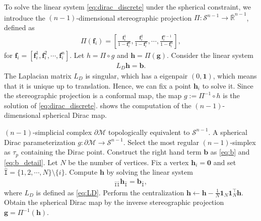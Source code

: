 \documentclass{article}
\begin{document}
To solve the linear system \eqref{eq:dirac_discrete} under the spherical constraint, we introduce the $(n-1)$-dimensional stereographic projection $\Pi:\mathcal{S}^{n-1} \to \overline{\mathbb{R}}^{n-1}$, defined as
\begin{align}
    \Pi(\mathbf{f}_i) = \left[ \frac{\mathbf{f}_i^{1}}{1-\mathbf{f}_i^{n}}, \frac{\mathbf{f}_i^{2}}{1-\mathbf{f}_i^{n}}, \cdots, \frac{\mathbf{f}_i^{n-1}}{1-\mathbf{f}_i^{n}} \right],
\end{align}
for $\mathbf{f}_i = [\mathbf{f}_i^1, \mathbf{f}_i^2, \cdots, \mathbf{f}_i^n]$. Let $h = \Pi \circ g$ and $\mathbf{h} = \Pi(\mathbf{g})$. Consider the linear system
\begin{align}
    L_D \mathbf{h} = \mathbf{b}.
\end{align}
The Laplacian matrix $L_D$ is singular, which has a eigenpair $(0,\mathbf{1})$, which means that it is unique up to translation. Hence, we can fix a point $\mathbf{h}_i$ to solve it. Since the stereographic projection is a conformal map, the map $g := \Pi^{-1}\circ h$ is the solution of \eqref{eq:dirac_discrete}.  shows the computation of the $(n-1)$-dimensional spherical Dirac map.

\begin{algorithm}[h]
\caption{Spherical parameterization by Dirac map}
\begin{algorithmic}[1] \label{alg:Dirac}
    \REQUIRE $(n-1)$-simplicial complex $\partial \mathcal{M}$ topologically equivalent to $\mathcal{S}^{n-1}$.
    \ENSURE A spherical Dirac parameterization $g: \partial \mathcal{M}\to \mathcal{S}^{n-1}$.
    \STATE Select the most regular $(n-1)$-simplex as $\tau_p$ containing the Dirac point.
    \STATE Construct the right hand term $\mathbf{b}$ as \eqref{eq:b} and \eqref{eq:b_detail}.
    \STATE Let $N$ be the number of vertices. Fix a vertex $\mathbf{h}_i = \mathbf{0}$ and set $\hat{\mathtt{I}} = \{1,2,\cdots,N\}\setminus \{i\}$.
    \STATE Compute $\mathbf{h}$ by solving the linear system
    \begin{align}
        [L_D]_{\hat{\mathtt{I}}\hat{\mathtt{I}}} \mathbf{h}_{\hat{\mathtt{I}}} = \mathbf{b}_{\hat{\mathtt{I}}},
    \end{align}
    where $L_D$ is defined as \eqref{eq:LD}.
    \STATE Perform the centralization $\mathbf{h} \gets \mathbf{h} - \frac{1}{N}\mathbf{1}_N \mathbf{1}_N^\top \mathbf{h}$.
    \STATE Obtain the spherical Dirac map by the inverse stereographic projection $\mathbf{g} = \Pi^{-1}(\mathbf{h})$.
\end{algorithmic}
\end{algorithm}
\end{document}
